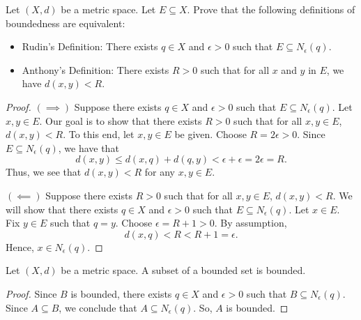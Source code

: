 \documentclass[a4paper]{article}
\begin{document}
   \begin{problem}
   Let \( (X,d) \) be a metric space. Let \( E \subseteq  X \). Prove that the following definitions of boundedness are equivalent:
    \begin{itemize}
        \item Rudin's Definition: There exists \( q \in X  \) and \( \epsilon > 0  \) such that \( E \subseteq {N}_{\epsilon}(q) \).
        \item Anthony's Definition: There exists \( R > 0  \) such that for all \( x  \) and \( y  \) in \( E  \), we have \( d(x,y) < R  \).
    \end{itemize}
   \end{problem}
   \begin{proof}
    \( (\implies) \) Suppose there exists \( q \in X  \) and \(  \epsilon > 0 \) such that \( E \subseteq  {N}_{\epsilon}(q) \). Let \( x,y \in E  \). Our goal is to show that there exists \( R > 0  \) such that for all \( x,y \in E  \), \( d(x,y) < R  \). To this end, let \( x,y \in E  \) be given. Choose \( R = 2 \epsilon > 0   \). Since \( E \subseteq  {N}_{\epsilon}(q) \), we have that         
    \[  d(x,y) \leq d(x,q) + d(q,y) < \epsilon + \epsilon = 2 \epsilon = R.  \]
    Thus, we see that \( d(x,y) < R  \) for any \( x,y \in E  \).

    \( (\impliedby) \) Suppose there exists \( R > 0  \) such that for all \( x,y \in E  \), \( d(x,y) < R  \). We will show that there exists \( q \in X  \) and \( \epsilon > 0  \) such that \( E \subseteq {N}_{\epsilon}(q) \). Let \( x \in E  \). Fix \( y \in E  \) such that \( q = y  \). Choose \( \epsilon = R + 1 > 0  \). By assumption,  
    \[  d(x,q) < R < R + 1 = \epsilon.  \]
    Hence, \( x \in {N}_{\epsilon}(q) \).
   \end{proof}

   \begin{lemma}[1]\label{lemma 1}
   Let \( (X,d) \) be a metric space. A subset of a bounded set is bounded. 
\end{lemma}
\begin{proof}
Since \( B  \) is bounded, there exists \( q \in X  \) and \( \epsilon > 0  \) such that \(  B \subseteq  {N}_{\epsilon}(q) \). Since \(  A \subseteq  B  \), we conclude that \( A \subseteq  {N}_{\epsilon}(q) \). So, \( A  \) is bounded.
\end{proof}
\end{document}

